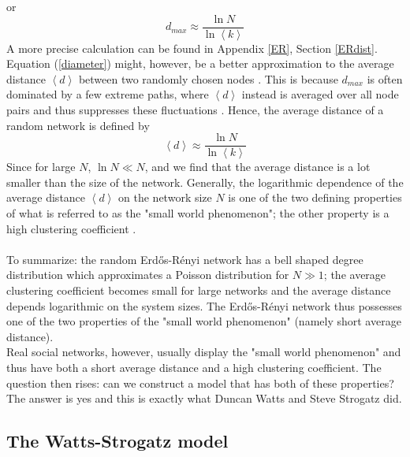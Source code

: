 \documentclass[11 pt , letterpaper , twoside , openright]{book}
\begin{document}
or 
\begin{equation}\label{diameter}
	d_{max} \approx \frac{\ln{N}}{\ln{\left<k\right>}}
\end{equation}
A more precise calculation can be found in Appendix \ref{ER}, Section \ref{ERdist}. Equation (\ref{diameter}) might, however, be a better approximation to the average distance $\left<d\right>$ between two randomly chosen nodes \cite{Albert2014}. This is because $d_{max}$ is often dominated by a few extreme paths, where $\left<d\right>$ instead is averaged over all node pairs and thus suppresses these fluctuations \cite{Albert2014}. Hence, the average distance of a random network is defined by \cite{Albert2014}
\begin{equation}\label{d}
	\left<d\right> \approx \frac{\ln{N}}{\ln{\left<k\right>}}
\end{equation}
Since for large $N$, $\ln{N} \ll N$, and we find that the average distance is a lot smaller than the size of the network. Generally, the logarithmic dependence of the average distance $\left<d\right>$ on the network size $N$ is one of the two defining properties of what is referred to as the "small world phenomenon"; the other property is a high clustering coefficient \cite{Easley2010}.  \\
\\
To summarize: the random Erd\H{o}s-R\'{e}nyi network has a bell shaped degree distribution which approximates a Poisson distribution for $N \gg 1$; the average clustering coefficient becomes small for large networks and the average distance depends logarithmic on the system sizes. The Erd\H{o}s-R\'{e}nyi network thus possesses one of the two properties of the "small world phenomenon" (namely short average distance).\\
Real social networks, however, usually display the "small world phenomenon" and thus have both a short average distance and a high clustering coefficient. The question then rises: can we construct a model that has both of these properties? The answer is yes and this is exactly what Duncan Watts and Steve Strogatz did.

\subsection{The Watts-Strogatz model}
\end{document}
